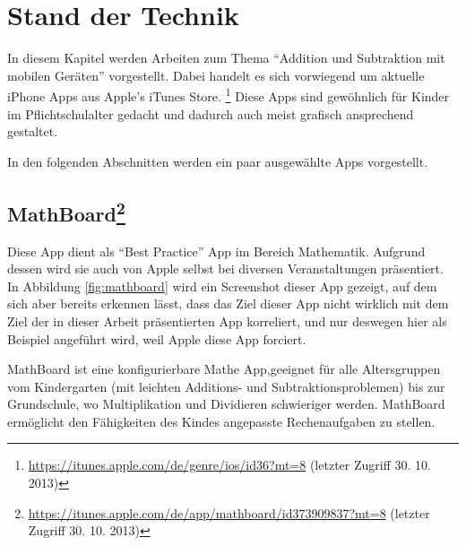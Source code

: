 

\chapter{Stand der Technik}
\label{chap:sota}

In diesem Kapitel werden Arbeiten zum Thema 
\enquote{Addition und Subtraktion mit mobilen Geräten} vorgestellt.
Dabei handelt es sich vorwiegend um aktuelle iPhone Apps aus 
Apple's iTunes Store. \footnote{\url{https://itunes.apple.com/de/genre/ios/id36?mt=8} (letzter Zugriff 30. 10. 2013)} Diese Apps sind 
gewöhnlich für Kinder im Pflichtschulalter gedacht und dadurch auch meist grafisch ansprechend 
gestaltet.

In den folgenden Abschnitten werden ein paar ausgewählte Apps vorgestellt.

\section[MathBoard]{MathBoard\footnote{\url{https://itunes.apple.com/de/app/mathboard/id373909837?mt=8} (letzter Zugriff 30. 10. 2013)}}
Diese App dient als \enquote{Best Practice} App im Bereich Mathematik. Aufgrund dessen wird sie 
auch von Apple selbst bei diversen Veranstaltungen präsentiert. In Abbildung \ref{fig:mathboard} 
wird ein Screenshot dieser App gezeigt, auf dem sich aber bereits erkennen lässt, dass das Ziel dieser App 
nicht wirklich mit dem Ziel der in dieser Arbeit präsentierten App korreliert, und nur deswegen hier als 
Beispiel angeführt wird, weil Apple diese App forciert.

MathBoard ist eine konfigurierbare Mathe App,geeignet für alle Altersgruppen vom Kindergarten (mit leichten Additions- und Subtraktionsproblemen) 
bis zur Grundschule, wo Multiplikation und Dividieren schwieriger werden. MathBoard ermöglicht 
den Fähigkeiten des Kindes angepasste Rechenaufgaben zu stellen.

